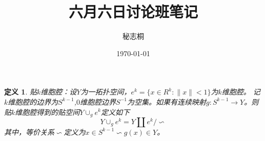 \documentclass[a4paper]{ctexart}
\begin{document}
\title{六月六日讨论班笔记}
\author{秘志桐}
\date{\today}
\maketitle
\renewcommand{\abstractname}{摘要}
\renewcommand{\refname}{参考文献}

\newtheorem{definition}{定义}
\newtheorem{theorem}{定理}
\newtheorem{lemma}{引理}
\newtheorem{corollary}{推论}
\newtheorem{prop}{命题}
\newtheorem{example}{例}
\newtheorem{remark}{注}
\begin{definition}贴$k$维胞腔：设$Y$为一拓扑空间，$e^k=\{x\in R^k: \|x\|<1\}$为$k$维胞腔。
记$k$维胞腔的边界为$S^{k-1}$,$0$维胞腔边界$S^{-1}$为空集。如果有连续映射$g:S^{k-1} \to Y$。则贴$k$维胞腔得到的贴空间$Y \cup_g e^k$定义如下
$$
Y \cup_g e^k=Y\amalg e^k/ \backsim
$$
其中，等价关系$\backsim$定义为$x\in S^{k-1} \backsim g(x)\in Y$。
\end{definition}
\end{document}
